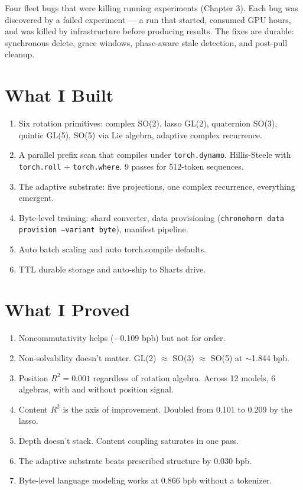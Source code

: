 \documentclass[11pt,a4paper]{report}
\begin{document}
Four fleet bugs that were killing running experiments (Chapter 3). Each bug was discovered by a failed experiment --- a run that started, consumed GPU hours, and was killed by infrastructure before producing results. The fixes are durable: synchronous delete, grace windows, phase-aware stale detection, and post-pull cleanup.

\section{What I Built}

\begin{enumerate}[nosep]
\item Six rotation primitives: complex SO(2), lasso GL(2), quaternion SO(3), quintic GL(5), SO(5) via Lie algebra, adaptive complex recurrence.
\item A parallel prefix scan that compiles under \texttt{torch.dynamo}. Hillis-Steele with \texttt{torch.roll} + \texttt{torch.where}. 9 passes for 512-token sequences.
\item The adaptive substrate: five projections, one complex recurrence, everything emergent.
\item Byte-level training: shard converter, data provisioning (\texttt{chronohorn data provision --variant byte}), manifest pipeline.
\item Auto batch scaling and auto torch.compile defaults.
\item TTL durable storage and auto-ship to Sharts drive.
\end{enumerate}

\section{What I Proved}

\begin{enumerate}[nosep]
\item Noncommutativity helps ($-$0.109 bpb) but not for order.
\item Non-solvability doesn't matter. GL(2) $\approx$ SO(3) $\approx$ SO(5) at $\sim$1.844 bpb.
\item Position $R^2 = 0.001$ regardless of rotation algebra. Across 12 models, 6 algebras, with and without position signal.
\item Content $R^2$ is the axis of improvement. Doubled from 0.101 to 0.209 by the lasso.
\item Depth doesn't stack. Content coupling saturates in one pass.
\item The adaptive substrate beats prescribed structure by 0.030 bpb.
\item Byte-level language modeling works at 0.866 bpb without a tokenizer.
\end{enumerate}
\end{document}
